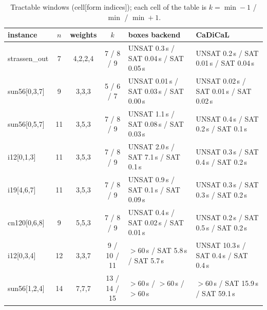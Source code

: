 \documentclass[conference]{IEEEtran}
\begin{document}
\begin{table}[!t]
\centering
\caption{Tractable windows (cell[form indices]); each cell of the table is
$k=\min-1$ / $\min$ / $\min+1$.}
\label{tab:windows}
{\footnotesize
\begin{tabular}{@{}l c c c l l@{}}
\toprule
instance & $n$ & weights & $k$ & boxes backend & CaDiCaL \\
\midrule
strassen\_out & 7 & 4,2,2,4 & 7 / 8 / 9 & UNSAT 0.3\,s / SAT 0.04\,s / SAT 0.05\,s & UNSAT 0.2\,s / SAT 0.01\,s / SAT 0.04\,s \\
sun56[0,3,7] & 9 & 3,3,3 & 5 / 6 / 7 & UNSAT 0.01\,s / SAT 0.03\,s / SAT 0.00\,s & UNSAT 0.02\,s / SAT 0.01\,s / SAT 0.02\,s \\
sun56[0,5,7] & 11 & 3,5,3 & 7 / 8 / 9 & UNSAT 1.1\,s / SAT 0.08\,s / SAT 0.03\,s & UNSAT 0.4\,s / SAT 0.2\,s / SAT 0.1\,s \\
i12[0,1,3] & 11 & 3,5,3 & 7 / 8 / 9 & UNSAT 2.0\,s / SAT 7.1\,s / SAT 0.1\,s & UNSAT 0.3\,s / SAT 0.4\,s / SAT 0.2\,s \\
i19[4,6,7] & 11 & 3,5,3 & 7 / 8 / 9 & UNSAT 0.9\,s / SAT 0.1\,s / SAT 0.09\,s & UNSAT 0.3\,s / SAT 0.3\,s / SAT 0.2\,s \\
cn120[0,6,8] & 9 & 5,5,3 & 7 / 8 / 9 & UNSAT 0.4\,s / SAT 0.02\,s / SAT 0.01\,s & UNSAT 0.2\,s / SAT 0.5\,s / SAT 0.2\,s \\
i12[0,3,4] & 12 & 3,3,7 & 9 / 10 / 11 & $>60$\,s / SAT 5.8\,s / SAT 5.7\,s & UNSAT 10.3\,s / SAT 0.4\,s / SAT 0.4\,s \\
sun56[1,2,4] & 14 & 7,7,7 & 13 / 14 / 15 & $>60$\,s / $>60$\,s / $>60$\,s & $>60$\,s / SAT 15.9\,s / SAT 59.1\,s \\
\bottomrule
\end{tabular}}
\end{table}
\end{document}

